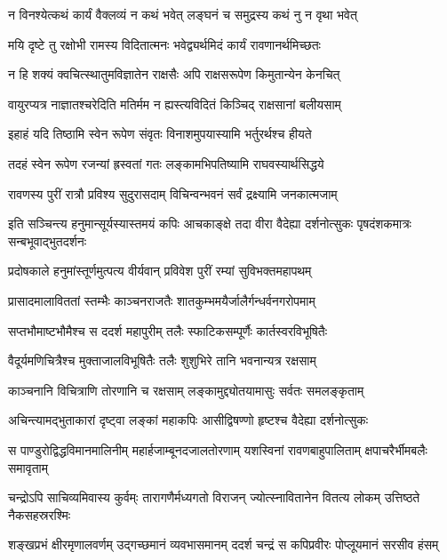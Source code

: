 \twolineshloka
{न विनश्येत्कथं कार्यं वैक्लव्यं न कथं भवेत्}
{लङ्घनं च समुद्रस्य कथं नु न वृथा भवेत्} %

\twolineshloka
{मयि दृष्टे तु रक्षोभी रामस्य विदितात्मनः}
{भवेद्व्यर्थमिदं कार्यं रावणानर्थमिच्छतः} %

\twolineshloka
{न हि शक्यं क्वचित्स्थातुमविज्ञातेन राक्षसैः}
{अपि राक्षसरूपेण किमुतान्येन केनचित्} %

\twolineshloka
{वायुरप्यत्र नाज्ञातश्चरेदिति मतिर्मम}
{न ह्यस्त्यविदितं किञ्चिद् राक्षसानां बलीयसाम्} %

\twolineshloka
{इहाहं यदि तिष्ठामि स्वेन रूपेण संवृतः}
{विनाशमुपयास्यामि भर्तुरर्थश्च हीयते} %

\twolineshloka
{तदहं स्वेन रूपेण रजन्यां ह्रस्वतां गतः}
{लङ्कामभिपतिष्यामि राघवस्यार्थसिद्धये} %

\twolineshloka
{रावणस्य पुरीं रात्रौ प्रविश्य सुदुरासदाम्}
{विचिन्वन्भवनं सर्वं द्रक्ष्यामि जनकात्मजाम्} %

\threelineshloka
{इति सञ्चिन्त्य हनुमान्सूर्यस्यास्तमयं कपिः}
{आचकाङ्क्षे तदा वीरा वैदेह्या दर्शनोत्सुकः}
{पृषदंशकमात्रः सन्बभूवाद्भुतदर्शनः} %

\twolineshloka
{प्रदोषकाले हनुमांस्तूर्णमुत्पत्य वीर्यवान्}
{प्रविवेश पुरीं रम्यां सुविभक्तमहापथम्} %

\twolineshloka
{प्रासादमालाविततां स्तम्भैः काञ्चनराजतैः}
{शातकुम्भमयैर्जालैर्गन्धर्वनगरोपमाम्} %

\twolineshloka
{सप्तभौमाष्टभौमैश्च स ददर्श महापुरीम्}
{तलैः स्फाटिकसम्पूर्णैः कार्तस्वरविभूषितैः} %

\twolineshloka
{वैदूर्यमणिचित्रैश्च मुक्ताजालविभूषितैः}
{तलैः शुशुभिरे तानि भवनान्यत्र रक्षसाम्} %

\twolineshloka
{काञ्चनानि विचित्राणि तोरणानि च रक्षसाम्}
{लङ्कामुद्द्योतयामासुः सर्वतः समलङ्कृताम्} %

\twolineshloka
{अचिन्त्यामद्भुताकारां दृष्ट्वा लङ्कां महाकपिः}
{आसीद्विषण्णो हृष्टश्च वैदेह्या दर्शनोत्सुकः} %

\fourlineindentedshloka
{स पाण्डुरोद्विद्धविमानमालिनीम्}
{महार्हजाम्बूनदजालतोरणाम्}
{यशस्विनां रावणबाहुपालिताम्}
{क्षपाचरैर्भीमबलैः समावृताम्} %

\fourlineindentedshloka
{चन्द्रोऽपि साचिव्यमिवास्य कुर्वम्ः}
{तारागणैर्मध्यगतो विराजन्}
{ज्योत्स्नावितानेन वितत्य लोकम्}
{उत्तिष्ठते नैकसहस्ररश्मिः} %

\fourlineindentedshloka
{शङ्खप्रभं क्षीरमृणालवर्णम्}
{उद्गच्छमानं व्यवभासमानम्}
{ददर्श चन्द्रं स कपिप्रवीरः}
{पोप्लूयमानं सरसीव हंसम्} %


